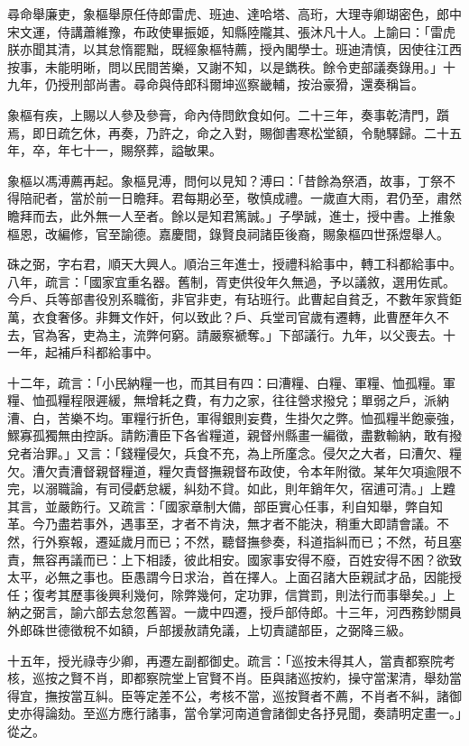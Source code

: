 \begin{pinyinscope}
尋命舉廉吏，象樞舉原任侍郎雷虎、班迪、達哈塔、高珩，大理寺卿瑚密色，郎中宋文運，侍講蕭維豫，布政使畢振姬，知縣陸隴其、張沐凡十人。上諭曰：「雷虎朕亦聞其清，以其怠惰罷黜，既經象樞特薦，授內閣學士。班迪清慎，因使往江西按事，未能明晰，問以民間苦樂，又謝不知，以是鐫秩。餘令吏部議奏錄用。」十九年，仍授刑部尚書。尋命與侍郎科爾坤巡察畿輔，按治豪猾，還奏稱旨。

象樞有疾，上賜以人參及參膏，命內侍問飲食如何。二十三年，奏事乾清門，躓焉，即日疏乞休，再奏，乃許之，命之入對，賜御書寒松堂額，令馳驛歸。二十五年，卒，年七十一，賜祭葬，謚敏果。

象樞以馮溥薦再起。象樞見溥，問何以見知？溥曰：「昔餘為祭酒，故事，丁祭不得陪祀者，當於前一日瞻拜。君每期必至，敬慎成禮。一歲直大雨，君仍至，肅然瞻拜而去，此外無一人至者。餘以是知君篤誠。」子學誠，進士，授中書。上推象樞恩，改編修，官至諭德。嘉慶間，錄賢良祠諸臣後裔，賜象樞四世孫煜舉人。

硃之弼，字右君，順天大興人。順治三年進士，授禮科給事中，轉工科都給事中。八年，疏言：「國家宜重名器。舊制，胥吏供役年久無過，予以議敘，選用佐貳。今戶、兵等部書役別系職銜，非官非吏，有玷班行。此曹起自貧乏，不數年家貲鉅萬，衣食奢侈。非舞文作奸，何以致此？戶、兵堂司官歲有遷轉，此曹歷年久不去，官為客，吏為主，流弊何窮。請嚴察褫奪。」下部議行。九年，以父喪去。十一年，起補戶科都給事中。

十二年，疏言：「小民納糧一也，而其目有四：曰漕糧、白糧、軍糧、恤孤糧。軍糧、恤孤糧程限遲緩，無增耗之費，有力之家，往往營求撥兌；單弱之戶，派納漕、白，苦樂不均。軍糧行折色，軍得銀則妄費，生掛欠之弊。恤孤糧半飽豪強，鰥寡孤獨無由控訴。請飭漕臣下各省糧道，親督州縣畫一編徵，盡數輸納，敢有撥兌者治罪。」又言：「錢糧侵欠，兵食不充，為上所廑念。侵欠之大者，曰漕欠、糧欠。漕欠責漕督親督糧道，糧欠責督撫親督布政使，令本年附徵。某年欠項逾限不完，以溺職論，有司侵虧怠緩，糾劾不貸。如此，則年銷年欠，宿逋可清。」上韙其言，並嚴飭行。又疏言：「國家章制大備，部臣實心任事，利自知舉，弊自知革。今乃盡若事外，遇事至，才者不肯決，無才者不能決，稍重大即請會議。不然，行外察報，遷延歲月而已；不然，聽督撫參奏，科道指糾而已；不然，茍且塞責，無容再議而已：上下相諉，彼此相安。國家事安得不廢，百姓安得不困？欲致太平，必無之事也。臣愚謂今日求治，首在擇人。上面召諸大臣親試才品，因能授任；復考其歷事後興利幾何，除弊幾何，定功罪，信賞罰，則法行而事舉矣。」上納之弼言，諭六部去怠忽舊習。一歲中四遷，授戶部侍郎。十三年，河西務鈔關員外郎硃世德徵稅不如額，戶部援赦請免議，上切責譴部臣，之弼降三級。

十五年，授光祿寺少卿，再遷左副都御史。疏言：「巡按未得其人，當責都察院考核，巡按之賢不肖，即都察院堂上官賢不肖。臣與諸巡按約，操守當潔清，舉劾當得宜，撫按當互糾。臣等定差不公，考核不當，巡按賢者不薦，不肖者不糾，諸御史亦得論劾。至巡方應行諸事，當令掌河南道會諸御史各抒見聞，奏請明定畫一。」從之。


\end{pinyinscope}
